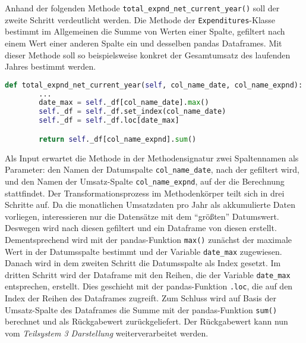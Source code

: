
    

    Anhand der folgenden Methode \texttt{total\_expnd\_net\_current\_year()} soll der zweite Schritt verdeutlicht werden.
    Die Methode der \texttt{Expenditures}-Klasse bestimmt im Allgemeinen die Summe von Werten einer Spalte, gefiltert
    nach einem Wert einer anderen Spalte ein und desselben pandas Dataframes. Mit dieser Methode soll so beispielsweise konkret der Gesamtumsatz des 
    laufenden Jahres bestimmt werden.

    \begin{lstlisting}[language=Python, caption=Teilsystem 2 Datenbearbeitung - total\_expnd\_net\_current\_year()]
    def total_expnd_net_current_year(self, col_name_date, col_name_expnd):
        ... 
        date_max = self._df[col_name_date].max()        
        self._df = self._df.set_index(col_name_date)
        self._df = self._df.loc[date_max]

        return self._df[col_name_expnd].sum()  
    \end{lstlisting}

    Als Input erwartet die Methode in der Methodensignatur zwei Spaltennamen als Parameter: den Namen der Datumspalte \texttt{col\_name\_date}, nach der gefiltert wird,
    und den Namen der Umsatz-Spalte \texttt{col\_name\_expnd}, auf der die Berechnung stattfindet. Der Transformationsprozess im Methodenkörper teilt sich in drei Schritte auf. Da die monatlichen Umsatzdaten pro Jahr als 
    akkumulierte Daten vorliegen, interessieren nur die Datensätze mit dem \enquote{größten} Datumswert. Deswegen
    wird nach diesen gefiltert und ein Dataframe von diesen erstellt. Dementsprechend wird mit der pandas-Funktion \texttt{max()} 
    zunächst der maximale Wert in der Datumsspalte bestimmt und der Variable \texttt{date\_max} zugewiesen. Danach wird in dem zweiten Schritt die Datumsspalte als Index gesetzt. 
    Im dritten Schritt wird der Dataframe mit den Reihen, die der Variable \texttt{date\_max} entsprechen, erstellt. Dies geschieht mit der pandas-Funktion \texttt{.loc}, die
    auf den Index der Reihen des Dataframes zugreift. Zum Schluss wird auf Basis der Umsatz-Spalte des Dataframes die Summe mit der pandas-Funktion \texttt{sum()} berechnet 
    und als Rückgabewert zurückgeliefert. Der Rückgabewert kann nun vom \textit{Teilsystem 3 Darstellung} weiterverarbeitet werden.\\

